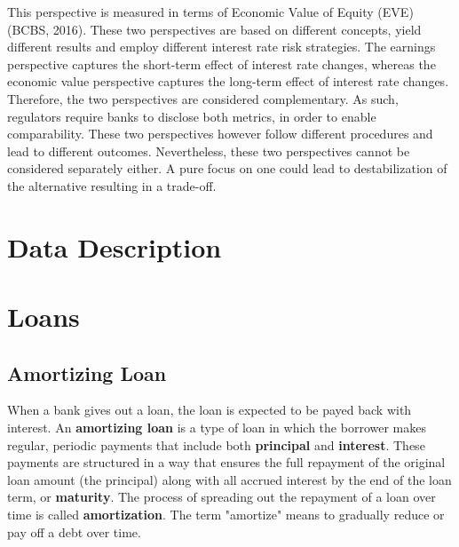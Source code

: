 \documentclass[11pt]{report}
\begin{document}
This perspective is measured in terms of Economic Value of Equity (EVE) (BCBS,
2016). These two perspectives are based on different concepts, yield different results
and employ different interest rate risk strategies.
The earnings perspective captures the short-term effect of interest rate changes, whereas
the economic value perspective captures the long-term effect of interest rate changes.
Therefore, the two perspectives are considered complementary. As such, regulators
require banks to disclose both metrics, in order to enable comparability. These two
perspectives however follow different procedures and lead to different outcomes. Nevertheless, these two perspectives cannot be considered separately either. A pure focus on one could lead to destabilization of the alternative resulting in a trade-off.




\chapter{Data Description}



\chapter{Loans}



\section{Amortizing Loan}

When a bank gives out a loan, the loan is expected to be payed back with interest. An \textbf{amortizing loan} is a type of loan in which the borrower makes regular, periodic payments that include both \textbf{principal} and \textbf{interest}. These payments are structured in a way that ensures the full repayment of the original loan amount (the principal) along with all accrued interest by the end of the loan term, or \textbf{maturity}. The process of spreading out the repayment of a loan over time is called \textbf{amortization}. The term "amortize" means to gradually reduce or pay off a debt over time.\\
\end{document}
